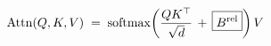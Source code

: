 \documentclass[preview]{standalone}
\begin{document}
\begin{align*}
\special{dvisvgm:raw <g id='unique000'>}\mathrm{Attn}(Q,K,V) \;=\; \mathrm{softmax}\!\left(\frac{Q K^{\top}}{\sqrt{d}} \,+\, \boxed{B^{\mathrm{rel}}}\right) V\special{dvisvgm:raw </g>}
\end{align*}
\end{document}
